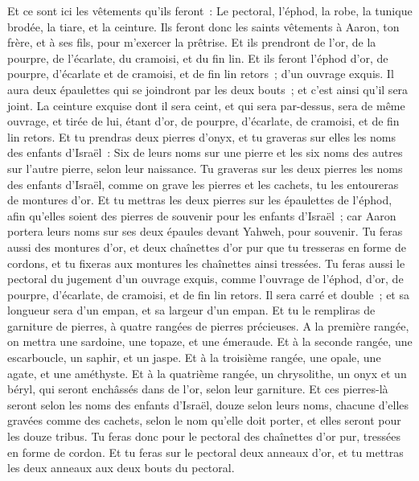\begin{multicols}{2}
Et ce sont ici les vêtements qu'ils feront~: Le pectoral, l'éphod, la robe, la tunique brodée, la tiare, et la ceinture. Ils feront donc les saints vêtements à Aaron, ton frère, et à ses fils, pour m'exercer la prêtrise.
Et ils prendront de l'or, de la pourpre, de l'écarlate, du cramoisi, et du fin lin.
Et ils feront l'éphod d'or, de pourpre, d'écarlate et de cramoisi, et de fin lin retors~; d'un ouvrage exquis.
Il aura deux épaulettes qui se joindront par les deux bouts~; et c'est ainsi qu'il sera joint.
La ceinture exquise dont il sera ceint, et qui sera par-dessus, sera de même ouvrage, et tirée de lui, étant d'or, de pourpre, d'écarlate, de cramoisi, et de fin lin retors.
Et tu prendras deux pierres d'onyx, et tu graveras sur elles les noms des enfants d'Israël~:
Six de leurs noms sur une pierre et les six noms des autres sur l'autre pierre, selon leur naissance.
Tu graveras sur les deux pierres les noms des enfants d'Israël, comme on grave les pierres et les cachets, tu les entoureras de montures d'or.
Et tu mettras les deux pierres sur les épaulettes de l'éphod, afin qu'elles soient des pierres de souvenir pour les enfants d'Israël~; car Aaron portera leurs noms sur ses deux épaules devant Yahweh, pour souvenir.
Tu feras aussi des montures d'or,
et deux chaînettes d'or pur que tu tresseras en forme de cordons, et tu fixeras aux montures les chaînettes ainsi tressées.
Tu feras aussi le pectoral du jugement d'un ouvrage exquis, comme l'ouvrage de l'éphod, d'or, de pourpre, d'écarlate, de cramoisi, et de fin lin retors.
Il sera carré et double~; et sa longueur sera d'un empan, et sa largeur d'un empan.
Et tu le rempliras de garniture de pierres, à quatre rangées de pierres précieuses. A la première rangée, on mettra une sardoine, une topaze, et une émeraude.
Et à la seconde rangée, une escarboucle, un saphir, et un jaspe.
Et à la troisième rangée, une opale, une agate, et une améthyste.
Et à la quatrième rangée, un chrysolithe, un onyx et un béryl, qui seront enchâssés dans de l'or, selon leur garniture.
Et ces pierres-là seront selon les noms des enfants d'Israël, douze selon leurs noms, chacune d'elles gravées comme des cachets, selon le nom qu'elle doit porter, et elles seront pour les douze tribus.
Tu feras donc pour le pectoral des chaînettes d'or pur, tressées en forme de cordon.
Et tu feras sur le pectoral deux anneaux d'or, et tu mettras les deux anneaux aux deux bouts du pectoral.

\end{multicols}
